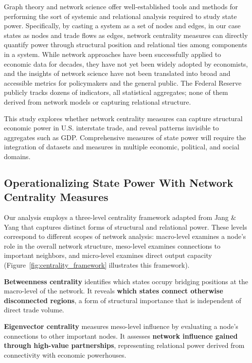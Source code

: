 \documentclass[12pt,oneside]{book}
\begin{document}
Graph theory and network science offer well-established tools and methods for performing the sort of systemic and relational analysis required to study state power. Specifically, by casting a system as a set of nodes and edges, in our case states as nodes and trade flows as edges, network centrality measures can directly quantify power through structural position and relational ties among components in a system. While network approaches have been successfully applied to economic data for decades, they have not yet been widely adopted by economists, and the insights of network science have not been translated into broad and accessible metrics for policymakers and the general public. The Federal Reserve publicly tracks dozens of indicators, all statistical aggregates; none of them derived from network models or capturing relational structure. 

This study explores whether network centrality measures can capture structural economic power in U.S. interstate trade, and reveal patterns invisible to aggregates such as GDP. Comprehensive measures of state power will require the integration of datasets and measures in multiple economic, political, and social domains.

\subsection*{Operationalizing State Power With Network Centrality Measures}

Our analysis employs a three-level centrality framework adapted from Jang \& Yang \cite{jang_measuring_2023} that captures distinct forms of structural and relational power. These levels correspond to different scopes of network analysis: macro-level examines a node's role in the overall network structure, meso-level examines connections to important neighbors, and micro-level examines direct output capacity (Figure~\ref{fig:centrality_framework} illustrates this framework). 

\textbf{Betweenness centrality} identifies which states occupy bridging positions at the macro-level of the network. It reveals \textbf{which states connect otherwise disconnected regions}, a form of structural importance that is independent of direct trade volume. 

\textbf{Eigenvector centrality} measures meso-level influence by evaluating a node's connections to other important nodes. It assesses \textbf{network influence gained through high-value partnerships}, representing relational power derived from connectivity with economic powerhouses.
\end{document}
